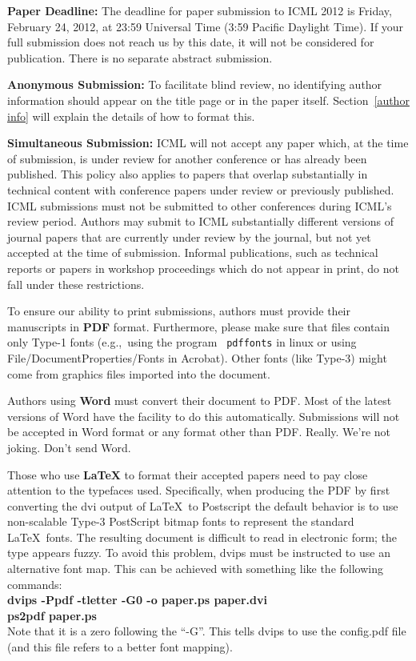 \documentclass{article}
\begin{document}
{\bf Paper Deadline:} The deadline for paper submission to ICML 2012
is Friday, February 24, 2012, at 23:59 Universal Time (3:59 Pacific Daylight Time).  If your full
submission does not reach us by this date, it will not be considered
for publication. There is no separate abstract submission.

{\bf Anonymous Submission:} To facilitate blind review, no identifying
author information should appear on the title page or in the paper
itself.  Section~\ref{author info} will explain the details of how to
format this.

{\bf Simultaneous Submission:} ICML will not accept any paper which,
at the time of submission, is under review for another conference or
has already been published. This policy also applies to papers that
overlap substantially in technical content with conference papers
under review or previously published. ICML submissions must not be
submitted to other conferences during ICML's review period. Authors
may submit to ICML substantially different versions of journal papers
that are currently under review by the journal, but not yet accepted
at the time of submission. Informal publications, such as technical
reports or papers in workshop proceedings which do not appear in
print, do not fall under these restrictions.

\medskip

To ensure our ability to print submissions, authors must provide their
manuscripts in \textbf{PDF} format.  Furthermore, please make sure
that files contain only Type-1 fonts (e.g.,~using the program {\tt
  pdffonts} in linux or using File/DocumentProperties/Fonts in
Acrobat).  Other fonts (like Type-3) might come from graphics files
imported into the document.

Authors using \textbf{Word} must convert their document to PDF.  Most
of the latest versions of Word have the facility to do this
automatically.  Submissions will not be accepted in Word format or any
format other than PDF. Really. We're not joking. Don't send Word.

Those who use \textbf{\LaTeX} to format their accepted papers need to
pay close attention to the typefaces used.  Specifically, when
producing the PDF by first converting the dvi output of \LaTeX\ to Postscript
the default behavior is to use non-scalable Type-3 PostScript bitmap
fonts to represent the standard \LaTeX\ fonts. The resulting document
is difficult to read in electronic form; the type appears fuzzy. To
avoid this problem, dvips must be instructed to use an alternative
font map.  This can be achieved with
something like the following commands:\\[0.5em]
{\bf dvips -Ppdf -tletter -G0 -o paper.ps paper.dvi}\\
{\bf ps2pdf paper.ps}\\[0.5em]
Note that it is a zero following the ``-G''.  This tells dvips to use
the config.pdf file (and this file refers to a better font mapping).
\end{document}
